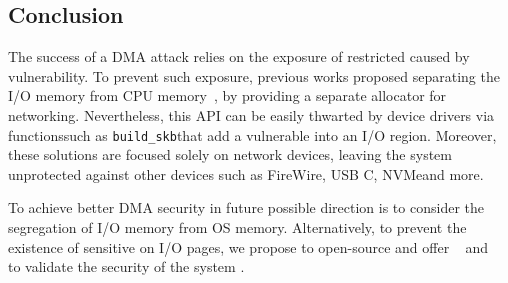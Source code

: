 
\subsection{Conclusion}\label{sec:Conclusion}




The success of a DMA attack relies on the exposure of restricted \DIFdelbegin {}\DIFdelend \DIFaddbegin {}\DIFaddend caused by \subpage{} vulnerability. 
To prevent such exposure, previous works \DIFdelbegin {}\DIFdelend proposed separating the I/O memory from CPU memory~\cite{MSMT18}, by providing a separate allocator for networking. 
Nevertheless, this API can be easily thwarted by device drivers via functions\DIFaddbegin \DIFadd{, }\DIFaddend such as \texttt{build\_skb}\DIFaddbegin \DIFadd{, }\DIFaddend that add a vulnerable \shinfo into an I/O region. 
Moreover, these solutions are focused solely on network devices, leaving the system unprotected against other \DIFdelbegin {}\DIFdelend \DIFaddbegin {}\DIFaddend devices such as FireWire, USB C, NVMe\DIFaddbegin \DIFadd{, }\DIFaddend and more.


To achieve better DMA security in future \DIFdelbegin {}\DIFdelend \DIFaddbegin {}\DIFaddend possible direction is to consider the segregation of I/O memory from OS memory. 
Alternatively, to prevent the existence of sensitive \DIFdelbegin {}\DIFdelend \DIFaddbegin {}\DIFaddend on I/O pages, we propose to open-source and offer \DIFdelbegin {}\DIFdelend \tool{}~\cite{SPADE} and \dkasan{}~\cite{DKASAN} to \DIFdelbegin {}\DIFdelend validate the security of the system \DIFaddbegin {}\DIFaddend . 



